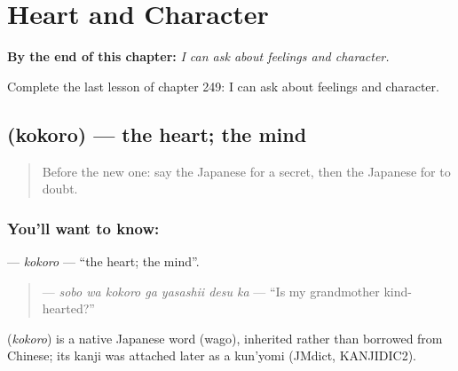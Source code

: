 
\chapter{Heart and Character}
\label{ch:ja-heart-and-character}

\begin{chapteropening}
\textbf{By the end of this chapter:} \emph{I can ask about feelings and character.}

Complete the last lesson of chapter 249: I can ask about feelings and character.
\end{chapteropening}

\section[\texorpdfstring{\ja{こころ} (kokoro)}{こころ (kokoro)}]{ (kokoro) — the heart; the mind}

\label{lesson:JA-C249-kokoro}



\begin{quote}
Before the new one: say the Japanese for a secret, then the Japanese for to doubt.
\end{quote}

\subsection*{You'll want to know: }
\textbf{} — \emph{kokoro} — \textquotedblleft{}the heart; the mind\textquotedblright{}.

\begin{quote}
\textbf{  } — \emph{sobo wa kokoro ga yasashii desu ka} — \textquotedblleft{}Is my grandmother kind-hearted?\textquotedblright{}
\end{quote}

\begin{cousinweb}
\textbf{} (\emph{kokoro}) is a native Japanese word (wago), inherited rather than borrowed from Chinese; its kanji was attached later as a kun'yomi (JMdict, KANJIDIC2).
\end{cousinweb}

